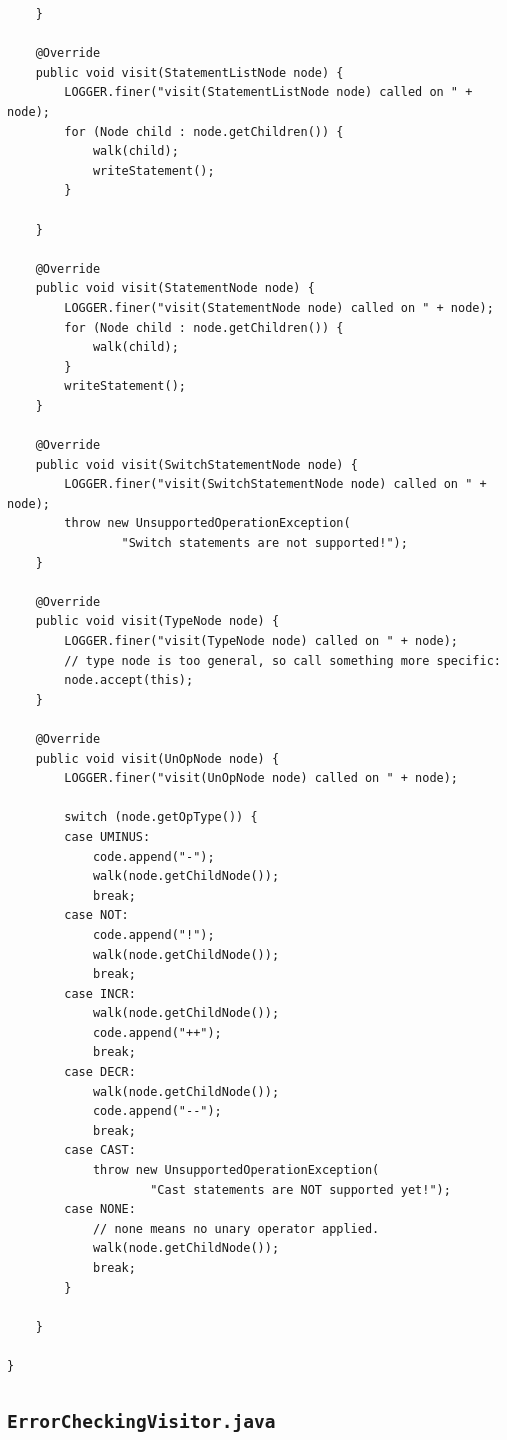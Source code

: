 \documentclass{book}
\begin{document}
\begin{verbatim}
	}

	@Override
	public void visit(StatementListNode node) {
		LOGGER.finer("visit(StatementListNode node) called on " + node);
		for (Node child : node.getChildren()) {
			walk(child);
			writeStatement();
		}

	}

	@Override
	public void visit(StatementNode node) {
		LOGGER.finer("visit(StatementNode node) called on " + node);
		for (Node child : node.getChildren()) {
			walk(child);
		}
		writeStatement();
	}

	@Override
	public void visit(SwitchStatementNode node) {
		LOGGER.finer("visit(SwitchStatementNode node) called on " + node);
		throw new UnsupportedOperationException(
				"Switch statements are not supported!");
	}

	@Override
	public void visit(TypeNode node) {
		LOGGER.finer("visit(TypeNode node) called on " + node);
		// type node is too general, so call something more specific:
		node.accept(this);
	}

	@Override
	public void visit(UnOpNode node) {
		LOGGER.finer("visit(UnOpNode node) called on " + node);

		switch (node.getOpType()) {
		case UMINUS:
			code.append("-");
			walk(node.getChildNode());
			break;
		case NOT:
			code.append("!");
			walk(node.getChildNode());
			break;
		case INCR:
			walk(node.getChildNode());
			code.append("++");
			break;
		case DECR:
			walk(node.getChildNode());
			code.append("--");
			break;
		case CAST:
			throw new UnsupportedOperationException(
					"Cast statements are NOT supported yet!");
		case NONE:
			// none means no unary operator applied.
			walk(node.getChildNode());
			break;
		}

	}

}
\end{verbatim}

\subsection{\texttt{ErrorCheckingVisitor.java}}
\end{document}
